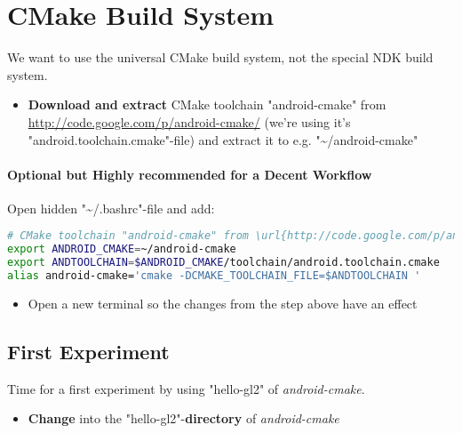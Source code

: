 \section{CMake Build System}
We want to use the universal CMake build system, not the special \ac{NDK} build system.

\begin{itemize}
\item{\textbf{Download and extract} CMake toolchain "android-cmake" from \url{http://code.google.com/p/android-cmake/} (we're using it's "android.toolchain.cmake"-file) and extract it to e.g. "\textasciitilde /android-cmake"}
\end{itemize}


\paragraph{Optional but Highly recommended for a Decent Workflow}
Open hidden "\textasciitilde /.bashrc"-file and add:
\begin{lstlisting}[language=sh]
# CMake toolchain "android-cmake" from \url{http://code.google.com/p/android-cmake/}
export ANDROID_CMAKE=~/android-cmake
export ANDTOOLCHAIN=$ANDROID_CMAKE/toolchain/android.toolchain.cmake
alias android-cmake='cmake -DCMAKE_TOOLCHAIN_FILE=$ANDTOOLCHAIN '
\end{lstlisting}
\begin{itemize}
\item{Open a new terminal so the changes from the step above have an effect}
\end{itemize}



\subsection{First Experiment}
Time for a first experiment by using "hello-gl2" of \emph{android-cmake}.

\begin{itemize}
\item{\textbf{Change} into the "hello-gl2"-\textbf{directory} of \emph{android-cmake}}
\end{itemize}


